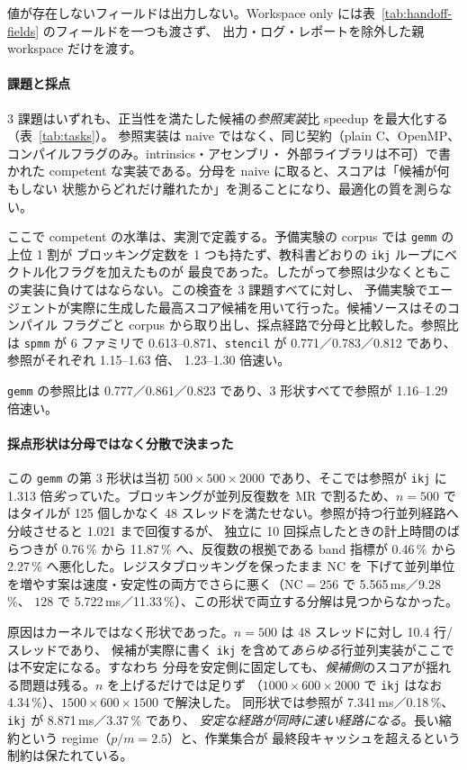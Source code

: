 \documentclass[conference,letterpaper]{IEEEtran}
\newcommand{\armW}{Workspace only}
\begin{document}
値が存在しないフィールドは出力しない。\armW{} には表~\ref{tab:handoff-fields} のフィールドを一つも渡さず、
出力・ログ・レポートを除外した親 workspace だけを渡す。

\paragraph{課題と採点}
3 課題はいずれも、正当性を満たした候補の\emph{参照実装}比 speedup を最大化する（表~\ref{tab:tasks}）。
参照実装は naive ではなく、同じ契約（plain C、OpenMP、コンパイルフラグのみ。intrinsics・アセンブリ・
外部ライブラリは不可）で書かれた competent な実装である。分母を naive に取ると、スコアは「候補が何もしない
状態からどれだけ離れたか」を測ることになり、最適化の質を測らない。

ここで competent の水準は、実測で定義する。予備実験の corpus では \texttt{gemm} の上位 1 割が
ブロッキング定数を 1 つも持たず、教科書どおりの \texttt{ikj} ループにベクトル化フラグを加えたものが
最良であった。したがって参照は少なくともこの実装に負けてはならない。この検査を 3 課題すべてに対し、
予備実験でエージェントが実際に生成した最高スコア候補を用いて行った。候補ソースはそのコンパイル
フラグごと corpus から取り出し、採点経路で分母と比較した。参照比は \texttt{spmm} が 6 ファミリで
0.613--0.871、\texttt{stencil} が 0.771／0.783／0.812 であり、参照がそれぞれ 1.15--1.63 倍、
1.23--1.30 倍速い。

\texttt{gemm} の参照比は 0.777／0.861／0.823 であり、3 形状すべてで参照が 1.16--1.29 倍速い。

\paragraph{採点形状は分母ではなく分散で決まった}
この \texttt{gemm} の第 3 形状は当初 $500\times500\times2000$ であり、そこでは参照が \texttt{ikj} に
1.313 倍\emph{劣って}いた。ブロッキングが並列反復数を $\mathrm{MR}$ で割るため、$n=500$ ではタイルが
125 個しかなく 48 スレッドを満たせない。参照が持つ行並列経路へ分岐させると 1.021 まで回復するが、
独立に 10 回採点したときの計上時間のばらつきが 0.76\,\% から 11.87\,\% へ、反復数の根拠である
band 指標が 0.46\,\% から 2.27\,\% へ悪化した。レジスタブロッキングを保ったまま $\mathrm{NC}$ を
下げて並列単位を増やす案は速度・安定性の両方でさらに悪く（$\mathrm{NC}=256$ で 5.565\,ms／9.28\,\%、
$128$ で 5.722\,ms／11.33\,\%）、この形状で両立する分解は見つからなかった。

原因はカーネルではなく形状であった。$n=500$ は 48 スレッドに対し 10.4 行/スレッドであり、
候補が実際に書く \texttt{ikj} を含めて\emph{あらゆる}行並列実装がここでは不安定になる。すなわち
分母を安定側に固定しても、\emph{候補側}のスコアが揺れる問題は残る。$n$ を上げるだけでは足りず
（$1000\times600\times2000$ で \texttt{ikj} はなお 4.34\,\%）、$1500\times600\times1500$ で解決した。
同形状では参照が 7.341\,ms／0.18\,\%、\texttt{ikj} が 8.871\,ms／3.37\,\% であり、
\emph{安定な経路が同時に速い経路になる}。長い縮約という regime（$p/m=2.5$）と、作業集合が
最終段キャッシュを超えるという制約は保たれている。
\end{document}
